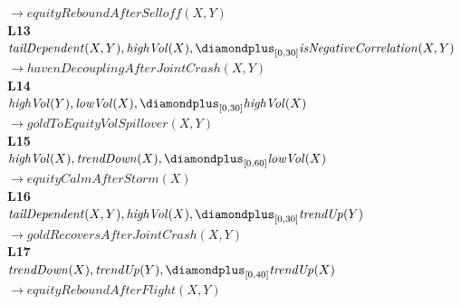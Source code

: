 \begin{figure}[t]
{\begin{minipage}{0.95\textwidth}
\hspace*{1.5em}\hspace*{3em}\mbox{$\to \mathit{equityReboundAfterSelloff}(X,Y)$}\\[4pt]
\textbf{L13}\\
\hspace*{1.5em}\mbox{$\mathit{tailDependent}(X,Y), \mathit{highVol}(X), \diamondplus_{[0,30]} \mathit{isNegativeCorrelation}(X,Y)$}\\
\hspace*{1.5em}\hspace*{3em}\mbox{$\to \mathit{havenDecouplingAfterJointCrash}(X,Y)$}\\[4pt]
\textbf{L14}\\
\hspace*{1.5em}\mbox{$\mathit{highVol}(Y), \mathit{lowVol}(X), \diamondplus_{[0,30]} \mathit{highVol}(X)$}\\
\hspace*{1.5em}\hspace*{3em}\mbox{$\to \mathit{goldToEquityVolSpillover}(X,Y)$}\\[4pt]
\textbf{L15}\\
\hspace*{1.5em}\mbox{$\mathit{highVol}(X), \mathit{trendDown}(X), \diamondplus_{[0,60]} \mathit{lowVol}(X)$}\\
\hspace*{1.5em}\hspace*{3em}\mbox{$\to \mathit{equityCalmAfterStorm}(X)$}\\[4pt]
\textbf{L16}\\
\hspace*{1.5em}\mbox{$\mathit{tailDependent}(X,Y), \mathit{highVol}(X), \diamondplus_{[0,30]} \mathit{trendUp}(Y)$}\\
\hspace*{1.5em}\hspace*{3em}\mbox{$\to \mathit{goldRecoversAfterJointCrash}(X,Y)$}\\[4pt]
\textbf{L17}\\
\hspace*{1.5em}\mbox{$\mathit{trendDown}(X), \mathit{trendUp}(Y), \diamondplus_{[0,40]} \mathit{trendUp}(X)$}\\
\hspace*{1.5em}\hspace*{3em}\mbox{$\to \mathit{equityReboundAfterFlight}(X,Y)$}\\[4pt]

\end{minipage}}
\end{figure}
